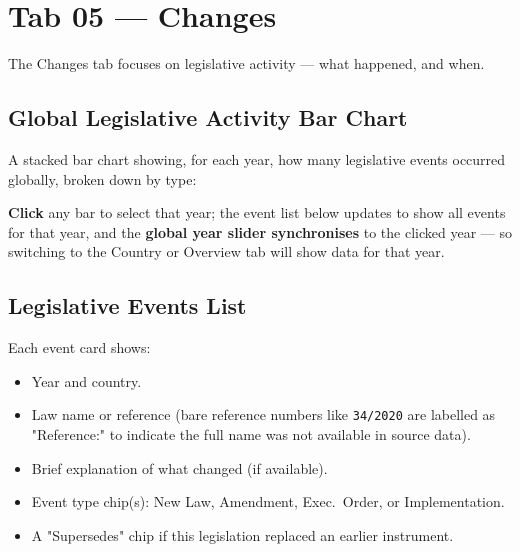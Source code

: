 \documentclass[12pt,a4paper]{article}
\newcommand{\badge}[2]{%
  \colorbox{#1}{\color{white}\footnotesize\textbf{\strut\,#2\,}}%
}
\begin{document}
\section{Tab 05 — Changes}
\label{sec:changes}

The Changes tab focuses on legislative activity — what happened, and when.

\subsection{Global Legislative Activity Bar Chart}

A stacked bar chart showing, for each year, how many legislative events occurred globally, broken down by type:


\textbf{Click} any bar to select that year; the event list below updates to show all events for that year, and the \textbf{global year slider synchronises} to the clicked year — so switching to the Country or Overview tab will show data for that year.

\subsection{Legislative Events List}

Each event card shows:
\begin{itemize}
  \item Year and country.
  \item Law name or reference (bare reference numbers like \texttt{34/2020} are labelled as "Reference:" to indicate the full name was not available in source data).
  \item Brief explanation of what changed (if available).
  \item Event type chip(s): New Law, Amendment, Exec.\ Order, or Implementation.
  \item A "Supersedes" chip if this legislation replaced an earlier instrument.
\end{itemize}
\end{document}
